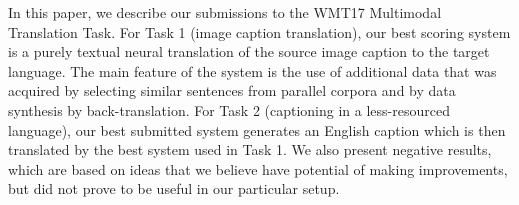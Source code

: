In this paper, we describe our submissions to the WMT17 Multimodal Translation Task. For Task 1 (image caption translation), our best scoring system is a purely textual neural translation  of the source image caption to the target language. The main feature of the system is the use of additional data that was acquired by selecting similar sentences from parallel corpora and by data synthesis by back-translation. For Task 2 (captioning in a less-resourced language), our best submitted system generates an English caption which is then translated by the best system used in Task 1. We also present negative results, which are based on ideas that we believe have potential of making improvements, but did not prove to be useful in our particular setup.
